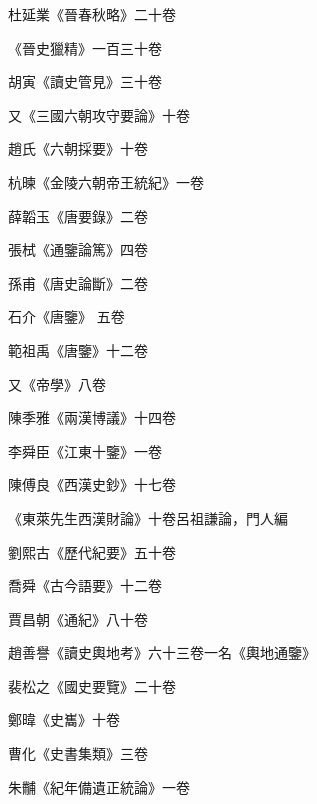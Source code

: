 \begin{pinyinscope}
 杜延業《晉春秋略》二十卷



 《晉史獵精》一百三十卷



 胡寅《讀史管見》三十卷



 又《三國六朝攻守要論》十卷



 趙氏《六朝採要》十卷



 杭暕《金陵六朝帝王統紀》一卷



 薛韜玉《唐要錄》二卷



 張栻《通鑒論篤》四卷



 孫甫《唐史論斷》二卷



 石介《唐鑒》
 五卷



 範祖禹《唐鑒》十二卷



 又《帝學》八卷



 陳季雅《兩漢博議》十四卷



 李舜臣《江東十鑒》一卷



 陳傅良《西漢史鈔》十七卷



 《東萊先生西漢財論》十卷呂祖謙論，門人編



 劉熙古《歷代紀要》五十卷



 喬舜《古今語要》十二卷



 賈昌朝《通紀》八十卷



 趙善譽《讀史輿地考》六十三卷一名《輿地通鑒》



 裴松之《國史要覽》二十卷



 鄭暐《史巂》十卷



 曹化《史書集類》三卷



 朱黼《紀年備遺正統論》一卷




\end{pinyinscope}
